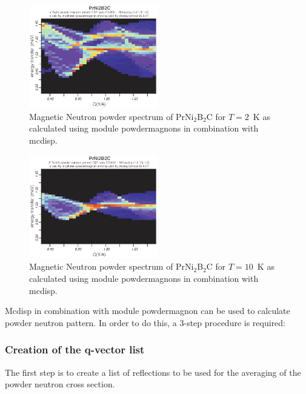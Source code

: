 \begin{figure}[tb]%
\begin{center}\leavevmode
\includegraphics[angle=0, width=0.5\textwidth]{figsrc/contour2K_070504.eps}
\end{center}
\caption{Magnetic Neutron powder spectrum of PrNi$_2$B$_2$C for $T=2$~K as calculated using module {\prg powdermagnons} %
in combination with {\prg 
mcdisp}.}\label{prni2b2c_2K}
\end{figure}

\begin{figure}[tb]%
\begin{center}\leavevmode
\includegraphics[angle=0, width=0.5\textwidth]{figsrc/contour10K_070504.eps}
\end{center}
\caption{Magnetic Neutron powder spectrum of PrNi$_2$B$_2$C for $T=10$~K  as calculated using module {\prg %
powdermagnons} in combination with {\prg 
mcdisp}.}\label{prni2b2c_10K}
\end{figure}

{\prg Mcdisp} in combination with module {\prg powdermagnon} can be used to calculate
powder neutron pattern. In order to do this, a 3-step procedure is required:

\subsubsection{Creation of the q-vector list}
The first step is to create a list of reflections to be used for 
the averaging of the powder neutron cross section. 

